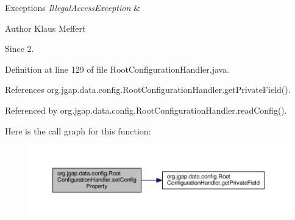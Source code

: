 \begin{DoxyExceptions}{Exceptions}
{\em Illegal\-Access\-Exception} & \\
\hline
\end{DoxyExceptions}
\begin{DoxyAuthor}{Author}
Klaus Meffert 
\end{DoxyAuthor}
\begin{DoxySince}{Since}
2. 
\end{DoxySince}


Definition at line 129 of file Root\-Configuration\-Handler.\-java.



References org.\-jgap.\-data.\-config.\-Root\-Configuration\-Handler.\-get\-Private\-Field().



Referenced by org.\-jgap.\-data.\-config.\-Root\-Configuration\-Handler.\-read\-Config().



Here is the call graph for this function\-:
\nopagebreak
\begin{figure}[H]
\begin{center}
\leavevmode
\includegraphics[width=350pt]{classorg_1_1jgap_1_1data_1_1config_1_1_root_configuration_handler_aae535baaf2667f1861137e89cdf0275e_cgraph}
\end{center}
\end{figure}


